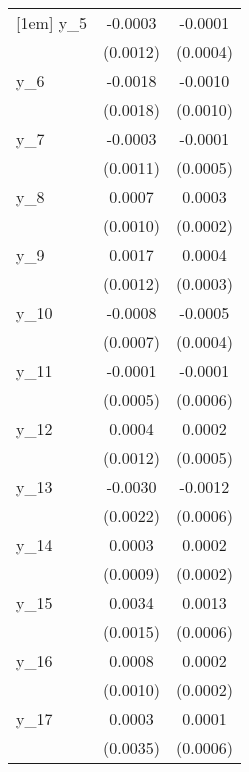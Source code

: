 {\begin{tabular}{l*{2}{c}}
[1em]
y\_5         &     -0.0003        &     -0.0001        \\
            &    (0.0012)        &    (0.0004)        \\
[1em]
y\_6         &     -0.0018        &     -0.0010        \\
            &    (0.0018)        &    (0.0010)        \\
[1em]
y\_7         &     -0.0003        &     -0.0001        \\
            &    (0.0011)        &    (0.0005)        \\
[1em]
y\_8         &      0.0007        &      0.0003        \\
            &    (0.0010)        &    (0.0002)        \\
[1em]
y\_9         &      0.0017        &      0.0004        \\
            &    (0.0012)        &    (0.0003)        \\
[1em]
y\_10        &     -0.0008        &     -0.0005        \\
            &    (0.0007)        &    (0.0004)        \\
[1em]
y\_11        &     -0.0001        &     -0.0001        \\
            &    (0.0005)        &    (0.0006)        \\
[1em]
y\_12        &      0.0004        &      0.0002        \\
            &    (0.0012)        &    (0.0005)        \\
[1em]
y\_13        &     -0.0030        &     -0.0012\sym{**}\\
            &    (0.0022)        &    (0.0006)        \\
[1em]
y\_14        &      0.0003        &      0.0002        \\
            &    (0.0009)        &    (0.0002)        \\
[1em]
y\_15        &      0.0034\sym{**}&      0.0013\sym{**}\\
            &    (0.0015)        &    (0.0006)        \\
[1em]
y\_16        &      0.0008        &      0.0002        \\
            &    (0.0010)        &    (0.0002)        \\
[1em]
y\_17        &      0.0003        &      0.0001        \\
            &    (0.0035)        &    (0.0006)        \\

\end{tabular}}
